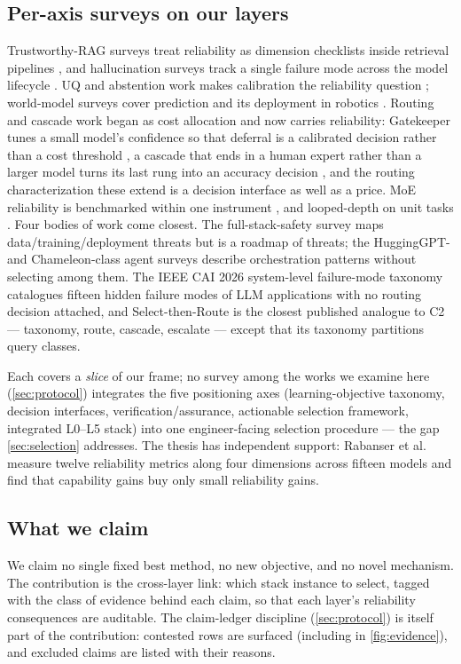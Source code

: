 \subsection{Per-axis surveys on our layers}
Trustworthy-RAG surveys treat reliability as dimension checklists inside retrieval pipelines
\cite{id250206872,id240910102}, and hallucination surveys track a single failure mode across
the model lifecycle \cite{id230901219,id251006265}. UQ and abstention work makes calibration
the reliability question \cite{id250315850,id240718418,id231108298}; world-model surveys cover
prediction and its deployment in robotics \cite{id251016732}. Routing and cascade work began
as cost allocation \cite{frugalgpt2023,id240215991,id250208773} and now carries reliability:
Gatekeeper tunes a small model's confidence so that deferral is a calibrated decision rather
than a cost threshold \cite{gatekeeper2025}, a cascade that ends in a human expert rather
than a larger model turns its last rung into an accuracy decision \cite{humandeferral2025},
and the routing characterization these extend \cite{id250606579,id251005164} is a decision
interface as well as a price. MoE reliability is benchmarked within one instrument
\cite{id240706204,id240611353}, and looped-depth on unit tasks \cite{id260713491}. Four bodies
of work come closest. The full-stack-safety survey \cite{ida25192} maps
data/training/deployment threats but is a roadmap of threats; the
HuggingGPT- and Chameleon-class agent surveys \cite{id230317580,id240509818} describe
orchestration patterns without selecting among them. The IEEE CAI 2026 system-level failure-mode
taxonomy \cite{ieeecai2026failure} catalogues fifteen hidden failure modes of LLM applications
with no routing decision attached, and Select-then-Route \cite{selectroute2025} is the closest
published analogue to C2 --- taxonomy, route, cascade, escalate --- except that its taxonomy
partitions query classes.

Each covers a \emph{slice} of our frame; no survey among the works we examine here
(\cref{sec:protocol}) integrates the five positioning axes (learning-objective taxonomy, decision
interfaces, verification/assurance, actionable selection framework, integrated L0--L5 stack) into
one engineer-facing selection procedure --- the gap \cref{sec:selection} addresses. The thesis has
independent support: Rabanser et al.\ \cite{rabanser2026agent} measure twelve reliability metrics
along four dimensions across fifteen models and find that capability gains buy only small
reliability gains.

\subsection{What we claim}
We claim no single fixed best method, no new objective, and no novel mechanism. The
contribution is the cross-layer link: which stack instance to select, tagged with the class of
evidence behind each claim, so that each layer's reliability consequences are auditable. The
claim-ledger discipline (\cref{sec:protocol}) is itself part of the contribution: contested rows
are surfaced (including in \cref{fig:evidence}), and excluded claims are listed with their
reasons.
